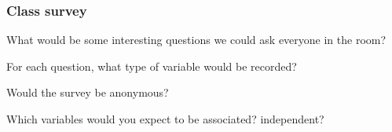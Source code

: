 

\begin{frame}
\frametitle{Class survey}
What would be some interesting questions we could ask everyone in the room?

For each question, what type of variable would be recorded?

Would the survey be anonymous?

Which variables would you expect to be associated? independent?

\end{frame}




